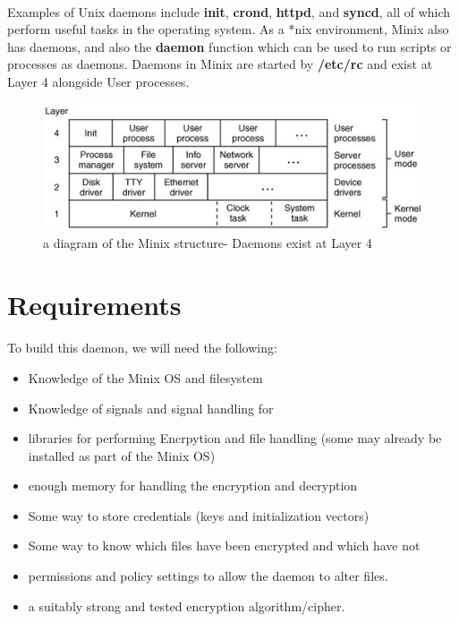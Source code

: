 \documentclass{article}
\begin{document}
        \paragraph{}Examples of Unix daemons include \textbf{init}, \textbf{crond}, \textbf{httpd}, and \textbf{syncd}, all of which perform useful tasks in the operating system. As a *nix environment, Minix also has daemons, and also the \textbf{daemon} function which can be used to run scripts or processes as daemons. Daemons in Minix are started by \textbf{/etc/rc} and exist at Layer 4 alongside User processes\parencite{OS_DESIGN}.
        \begin{figure}[htbp]
            \centering\includegraphics[width=\textwidth]{minix_structure.jpg}
            \caption{a diagram of the Minix structure- Daemons exist at Layer 4\parencite{OS_DESIGN}}
            \label{fig:my_label}
        \end{figure}
\newpage

\section{Requirements}
    \paragraph{}To build this daemon, we will need the following:
    \begin{itemize}
        \item Knowledge of the Minix OS and filesystem
        \item Knowledge of signals and signal handling for
        \item libraries for performing Encrpytion and file handling (some may already be installed as part of the Minix OS)
        \item enough memory for handling the encryption and decryption
        \item Some way to store credentials (keys and initialization vectors)
        \item Some way to know which files have been encrypted and which have not
        \item permissions and policy settings to allow the daemon to alter files.
        \item a suitably strong and tested encryption algorithm/cipher.
    \end{itemize}
\end{document}
